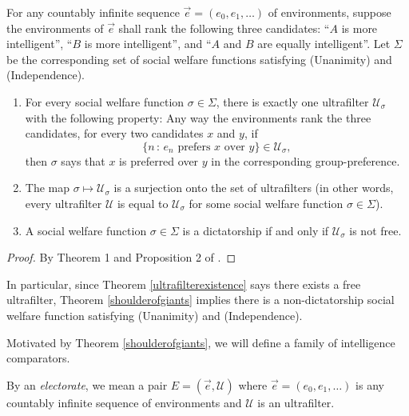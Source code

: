 \documentclass[twoside,11pt]{article}
\begin{document}
\begin{theorem}
\label{shoulderofgiants}
    For any countably infinite
    sequence $\vec{e}=(e_0,e_1,\ldots)$ of environments, suppose the
    environments of $\vec{e}$
    shall rank the following three candidates: ``$A$ is more intelligent'',
    ``$B$ is more intelligent'', and ``$A$ and $B$ are equally intelligent''.
    Let $\Sigma$ be the corresponding set of social welfare functions satisfying
    (Unanimity) and (Independence).
    \begin{enumerate}
        \item
        For every social welfare function $\sigma\in\Sigma$, there is exactly one
        ultrafilter $\mathscr U_\sigma$ with the following property:
        Any way the environments rank the three candidates, for every two candidates
        $x$ and $y$,
        if
        \[
            \{n\,:\,\mbox{$e_n$ prefers $x$ over $y$}\} \in \mathscr U_\sigma,
        \]
        then $\sigma$ says that $x$ is preferred
        over $y$ in the corresponding group-preference.
        \item
        The map $\sigma\mapsto \mathscr U_\sigma$ is a surjection onto the set of ultrafilters
        (in other words, every ultrafilter $\mathscr U$ is equal to $\mathscr U_\sigma$ for
        some social welfare function $\sigma\in\Sigma$).
        \item
        A social welfare function $\sigma\in\Sigma$ is a dictatorship if and only if
        $\mathscr U_\sigma$ is not free.
    \end{enumerate}
\end{theorem}

\begin{proof}
    By Theorem 1 and Proposition 2 of \citet{kirman}.
\end{proof}

In particular, since Theorem \ref{ultrafilterexistence} says there exists a free
ultrafilter, Theorem \ref{shoulderofgiants} implies there is a non-dictatorship
social welfare function satisfying (Unanimity) and (Independence).

Motivated by Theorem \ref{shoulderofgiants}, we will define a family of intelligence
comparators.

\begin{definition}
    By an \emph{electorate}, we mean a
    pair $E=(\vec{e}, \mathscr U)$ where
    $\vec{e}=(e_0,e_1,\ldots)$ is any countably infinite sequence of environments
    and $\mathscr U$ is an ultrafilter.
\end{definition}
\end{document}
